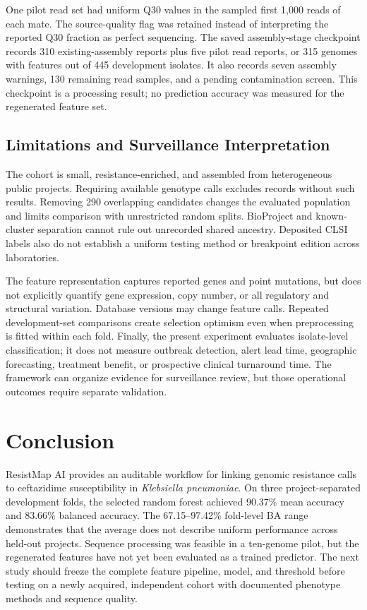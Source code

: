 \documentclass[conference]{IEEEtran}
\newcommand{\kp}{\textit{Klebsiella pneumoniae}}
\begin{document}
One pilot read set had uniform Q30 values in the sampled first 1,000 reads of each mate. The source-quality flag was retained instead of interpreting the reported Q30 fraction as perfect sequencing. The saved assembly-stage checkpoint records 310 existing-assembly reports plus five pilot read reports, or 315 genomes with features out of 445 development isolates. It also records seven assembly warnings, 130 remaining read samples, and a pending contamination screen. This checkpoint is a processing result; no prediction accuracy was measured for the regenerated feature set.

\subsection{Limitations and Surveillance Interpretation}
The cohort is small, resistance-enriched, and assembled from heterogeneous public projects. Requiring available genotype calls excludes records without such results. Removing 290 overlapping candidates changes the evaluated population and limits comparison with unrestricted random splits. BioProject and known-cluster separation cannot rule out unrecorded shared ancestry. Deposited CLSI labels also do not establish a uniform testing method or breakpoint edition across laboratories.

The feature representation captures reported genes and point mutations, but does not explicitly quantify gene expression, copy number, or all regulatory and structural variation. Database versions may change feature calls. Repeated development-set comparisons create selection optimism even when preprocessing is fitted within each fold. Finally, the present experiment evaluates isolate-level classification; it does not measure outbreak detection, alert lead time, geographic forecasting, treatment benefit, or prospective clinical turnaround time. The framework can organize evidence for surveillance review, but those operational outcomes require separate validation.

\section{Conclusion}
ResistMap AI provides an auditable workflow for linking genomic resistance calls to ceftazidime susceptibility in \kp{}. On three project-separated development folds, the selected random forest achieved 90.37\% mean accuracy and 83.66\% balanced accuracy. The 67.15--97.42\% fold-level BA range demonstrates that the average does not describe uniform performance across held-out projects. Sequence processing was feasible in a ten-genome pilot, but the regenerated features have not yet been evaluated as a trained predictor. The next study should freeze the complete feature pipeline, model, and threshold before testing on a newly acquired, independent cohort with documented phenotype methods and sequence quality.
\end{document}
